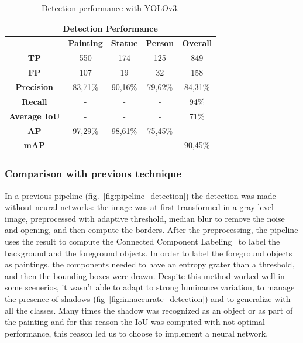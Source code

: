 \begin{table}[ht!]
    \centering
\begin{tabular}{|c|c|c|c|c|}
\hline
\multicolumn{5}{|c|}{\textbf{Detection Performance}}       \\ \hline
\multicolumn{1}{|l|}{} & \textbf{Painting} & \textbf{Statue} & \textbf{Person} & \textbf{Overall} \\ \hline
\textbf{TP}        & 550     & 174     & 125     & 849     \\ \hline
\textbf{FP}        & 107     & 19      & 32      & 158     \\ \hline
\textbf{Precision} & 83,71\% & 90,16\% & 79,62\% & 84,31\% \\ \hline
\textbf{Recall}    & -       & -       & -       & 94\%    \\ \hline
\textbf{Average IoU}       & -       & -       & -       & 71\%    \\ \hline
\textbf{AP}        & 97,29\% & 98,61\% & 75,45\% & -       \\ \hline
\textbf{mAP}       & -       & -       & -       & 90,45\% \\ \hline
\end{tabular}
\caption{Detection performance with YOLOv3.}
    \label{tab:detection_performance}
\end{table}



\subsubsection{Comparison with previous technique}
In a previous pipeline (fig.~\ref{fig:pipeline_detection}) the detection was made without neural networks: the image was at first transformed in a gray level image, preprocessed with adaptive threshold, median blur \cite{median-blur} to remove the noise and opening, and then compute the borders.
After the preprocessing, the pipeline uses the result to compute the  Connected Component Labeling~\cite{Grana_ccl} to label the background and the foreground objects.
In order to label the foreground objects as paintings, the components needed to have an entropy grater than a threshold, and then the bounding boxes were drawn.
Despite this method worked well in some scenerios, it wasn't able to adapt to strong luminance variation, to manage the presence of shadows (fig~\ref{fig:innaccurate_detection}) and to generalize with all the classes. Many times the shadow was recognized as an object or as part of the painting and for this reason the IoU was computed with not optimal performance, this reason led us to choose to implement a neural network.

